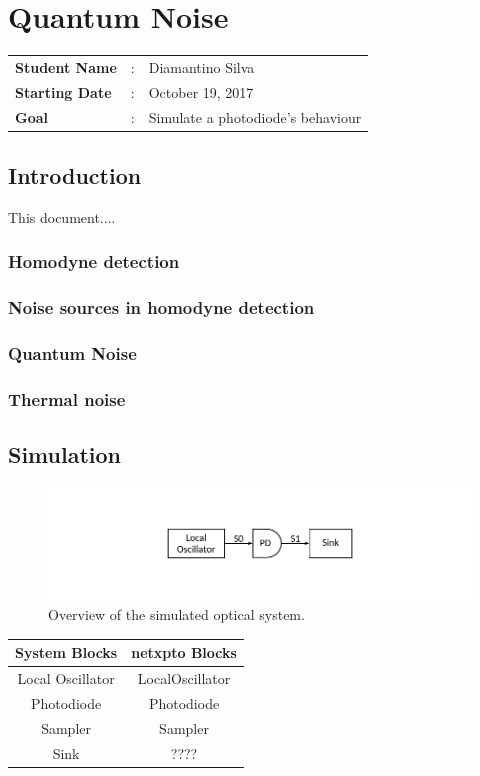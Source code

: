 \clearpage
\section{Quantum Noise}

\begin{tcolorbox}	
\begin{tabular}{p{2.75cm} p{0.2cm} p{10.5cm}}
\textbf{Student Name}  &:& Diamantino Silva\\
\textbf{Starting Date} &:& October 19, 2017\\
\textbf{Goal}          &:& Simulate a photodiode's behaviour
\end{tabular}
\end{tcolorbox}


\subsection*{Introduction}\label{sec:intro}


This document....


\subsubsection{Homodyne detection}
%
\subsubsection{Noise sources in homodyne detection}
\subsubsection{Quantum Noise}
\subsubsection{Thermal noise}
\subsection*{Simulation}

\begin{figure}[H]
\centering
\includegraphics[width=\linewidth]{./sdf/photodiode_study/figures/scheme_setup.pdf}
\caption{Overview of the simulated optical system.}
\label{fig:setup}
\end{figure}
%
\begin{table}[H]
\centering
\begin{tabular}{c|c}
System Blocks     & netxpto Blocks\\
\hline
Local Oscillator  & LocalOscillator\\
Photodiode        & Photodiode\\
Sampler           & Sampler\\
Sink			  & ????\\ 
\end{tabular}
\end{table}


